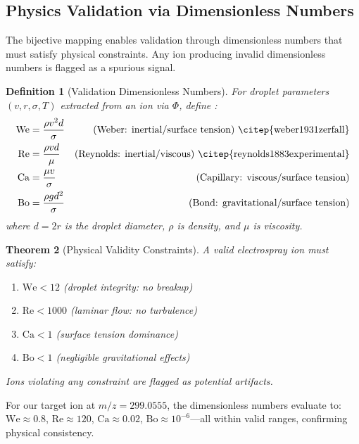 \documentclass[twocolumn,10pt]{article}
\newtheorem{theorem}{Theorem}[section]
\newtheorem{definition}[theorem]{Definition}
\begin{document}
\subsection{Physics Validation via Dimensionless Numbers}

The bijective mapping enables validation through dimensionless numbers that must satisfy physical constraints. Any ion producing invalid dimensionless numbers is flagged as a spurious signal.

\begin{definition}[Validation Dimensionless Numbers]
For droplet parameters $(v, r, \sigma, T)$ extracted from an ion via $\Phi$, define \citep{batchelor2000introduction}:
\begin{align}
\text{We} &= \frac{\rho v^2 d}{\sigma} & \text{(Weber: inertial/surface tension) \citep{weber1931zerfall}} \\
\text{Re} &= \frac{\rho v d}{\mu} & \text{(Reynolds: inertial/viscous) \citep{reynolds1883experimental}} \\
\text{Ca} &= \frac{\mu v}{\sigma} & \text{(Capillary: viscous/surface tension)} \\
\text{Bo} &= \frac{\rho g d^2}{\sigma} & \text{(Bond: gravitational/surface tension)}
\end{align}
where $d = 2r$ is the droplet diameter, $\rho$ is density, and $\mu$ is viscosity.
\end{definition}

\begin{theorem}[Physical Validity Constraints]
A valid electrospray ion \citep{fenn1989electrospray,kebarle2009electrospray} must satisfy:
\begin{enumerate}
\item $\text{We} < 12$ (droplet integrity: no breakup)
\item $\text{Re} < 1000$ (laminar flow: no turbulence)
\item $\text{Ca} < 1$ (surface tension dominance)
\item $\text{Bo} < 1$ (negligible gravitational effects)
\end{enumerate}
Ions violating any constraint are flagged as potential artifacts.
\end{theorem}

For our target ion at $m/z = 299.0555$, the dimensionless numbers evaluate to: $\text{We} \approx 0.8$, $\text{Re} \approx 120$, $\text{Ca} \approx 0.02$, $\text{Bo} \approx 10^{-6}$---all within valid ranges, confirming physical consistency.
\end{document}

